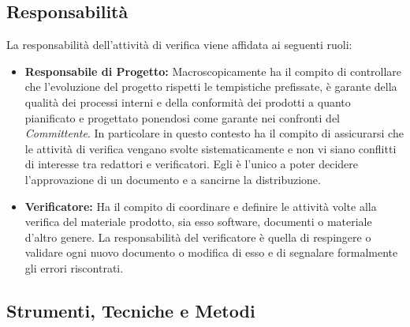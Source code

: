 \subsection{Responsabilità}

La responsabilità dell'attività di verifica viene affidata ai seguenti ruoli:

\begin{itemize}
	\item \textbf{Responsabile di Progetto:} Macroscopicamente ha il compito di controllare che l'evoluzione del progetto rispetti le tempistiche prefissate, è garante della qualità dei processi interni e della conformità dei prodotti a quanto pianificato e progettato ponendosi come garante nei confronti del \textit{Committente}. In particolare in questo contesto ha il compito di assicurarsi che le attività di verifica vengano svolte sistematicamente e non vi siano conflitti di interesse tra redattori e verificatori. Egli è l'unico a poter decidere l'approvazione di un documento e a sancirne la distribuzione.
	\item \textbf{Verificatore:} Ha il compito di coordinare e definire le attività volte alla verifica del materiale prodotto, sia esso software, documenti o materiale d'altro genere. La responsabilità del verificatore è quella di respingere o validare ogni nuovo documento o modifica di esso e di segnalare formalmente gli errori riscontrati.
\end{itemize}

\subsection{Strumenti, Tecniche e Metodi}
